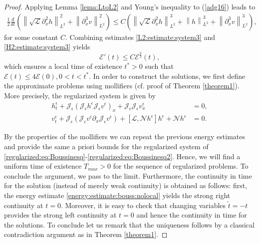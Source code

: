 \documentclass[10pt,a4paper]{amsart}
\newcommand{\norm}[1]{\left\| #1 \right\|}
\newcommand{\pa}{\partial}
\begin{document}
\begin{proof}
Applying Lemma \ref{lema:LtoL2} and Young's inequality to (\ref{adg16}) leads to
\begin{align}\label{H2:estimate:system3}
\frac{1}{2}\frac{d}{dt}\left( \norm{\sqrt{\mathscr{L}}\pa_{x}^{2}h}_{L^{2}}^{2}+ \norm{\pa_{x}^{3}v}_{L^{2}}^{2} \right) \leq  C \left( \norm{\sqrt{\mathscr{L}}\pa_{x}^2 h}^{3}_{L^{2}}+\norm{h}^{3}_{L^{2}} +\norm{\pa_{x}^{3}v}^{3}_{L^{2}}\right),
\end{align}
for some constant $C$. 
Combining estimates \eqref{L2:estimate:system3} and \eqref{H2:estimate:system3} yields
\begin{equation}\label{energy:estimate:bouss:nolocal}
\mathcal{E}'(t)\leq C \mathcal{E}^{\frac{3}{2}}(t),
\end{equation}
which ensures a local time of existence $t^{*}>0$ such that $\mathcal{E}(t)\leq 4 \mathcal{E}(0), 0<t<t^{*}.$
In order to construct the solutions, we first define the approximate problems using mollifiers (cf. proof of Theorem \ref{theorem1}). More precisely, the regularized system is given by
\begin{subequations}
	\begin{align}
		h^{\epsilon}_t+\mathcal{J}_{\epsilon}(\mathcal{J}_{\epsilon}h^{\epsilon}\mathcal{J}_{\epsilon}v^{\epsilon})_x+\mathcal{J}_{\epsilon}\mathcal{J}_{\epsilon}v^{\epsilon}_x&=0, \label{regularized:eq:Boussinesq} \\
		v^{\epsilon}_t+\mathcal{J}_{\epsilon}(\mathcal{J}_{\epsilon}v^{\epsilon}\partial_{x}\mathcal{J}_{\epsilon}v^{\epsilon})+\left[\mathscr{L},\mathscr{N}h^{\epsilon}\right]h^{\epsilon}+\mathscr{N}h^{\epsilon}&=0.\label{regularized:eq:Boussinesq2}
	\end{align}
\end{subequations}


 By the properties of the mollifiers we can repeat the previous energy estimates and provide the same a priori bounds for the regularized system of \eqref{regularized:eq:Boussinesq}-\eqref{regularized:eq:Boussinesq2}. Hence, we will find a uniform time of existence $T_{max}>0$ for the sequence of regularized problems. To conclude the argument, we pass to the limit. Furthermore, the continuity in time for the solution (instead of merely weak continuity) is obtained as follows: first, the energy estimate \eqref{energy:estimate:bouss:nolocal} yields the strong right continuity at $t=0$. Moreover, it is easy to check that changing variables $\tilde{t}=-t$ provides the strong left continuity at $t=0$ and hence the continuity in time for the solutions. To conclude let us remark that the uniqueness follows by a classical contradiction argument as in Theorem \ref{theorem1}.
\end{proof}
\end{document}
